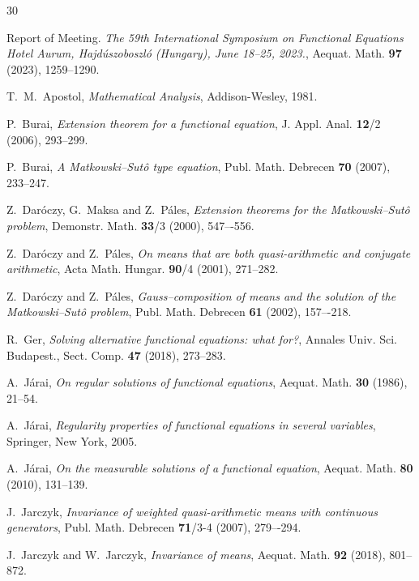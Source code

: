 \documentclass[12pt]{amsart}
\theoremstyle{remark}
\theoremstyle{definition}
\begin{document}

\begin{thebibliography}{30}

Report of Meeting. 
{\em The 59th International Symposium on 
Functional Equations 
Hotel Aurum, Hajdúszoboszló (Hungary), June 18–25, 2023.}, 
Aequat. Math. {\bf 97} (2023), 1259--1290. 

T.~M.~Apostol, 
{\em Mathematical Analysis}, 
Addison-Wesley, 1981.

P.~Burai, 
{\em Extension theorem for a functional equation}, 
J. Appl. Anal. {\bf 12}/2 (2006), 293--299. 

P.~Burai, 
{\em A Matkowski--Sut\^o type equation}, 
Publ. Math. Debrecen  {\bf 70} (2007), 233--247. 

Z.~Dar\'oczy, G.~Maksa and Z.~P\'ales, 
{\em Extension theorems for the 
Matkowski--Sut\^o problem}, 
Demonstr. Math. {\bf 33}/3 (2000), 547–-556. 

Z.~Dar\'oczy and Z.~P\'ales, 
{\em On means that are both quasi-arithmetic and 
conjugate arithmetic}, 
Acta Math. Hungar. {\bf 90}/4 (2001), 271--282. 

Z.~Dar\'oczy and Z.~P\'ales, 
{\em Gauss--composition of means 
and the solution of the Matkowski--Sut\^o problem}, 
Publ. Math. Debrecen {\bf 61} (2002), 157–-218. 

R.~Ger, 
{\em Solving alternative functional equations: 
what for?}, 
Annales Univ. Sci. Budapest., 
Sect. Comp. {\bf 47} (2018), 273--283. 

A.~J\'arai, 
{\em On regular solutions of functional equations}, 
Aequat. Math. {\bf 30} (1986), 21--54. 

A.~J\'arai, 
{\em Regularity properties of functional equations 
in several variables}, 
Springer, New York, 2005.

A.~J\'arai, 
{\em On the measurable solutions of a functional equation}, 
Aequat. Math. {\bf 80} (2010), 131--139. 

J.~Jarczyk, 
{\em Invariance of weighted quasi-arithmetic means 
with continuous generators}, 
Publ. Math. Debrecen {\bf 71}/3-4 (2007), 279–-294. 

J.~Jarczyk and W.~Jarczyk, 
{\em Invariance of means}, 
Aequat. Math. {\bf 92} (2018), 801--872. 


\end{thebibliography}
\end{document}
